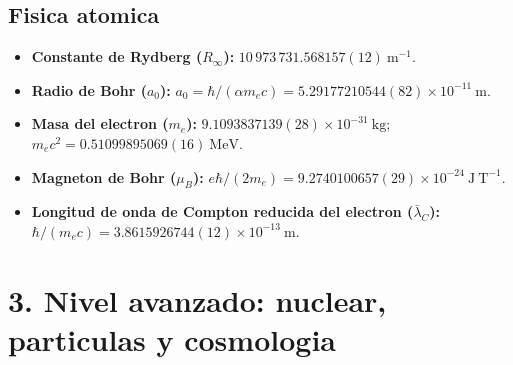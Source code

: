 \documentclass[11pt,a4paper]{article}
\begin{document}
\subsection*{Fisica atomica}

\begin{itemize}
  \item \textbf{Constante de Rydberg ($R_\infty$):} $10\,973\,731.568157(12)\ \mathrm{m^{-1}}$.
  \item \textbf{Radio de Bohr ($a_0$):} $a_0=\hbar/(\alpha m_ec)=5.29177210544(82)\times10^{-11}\ \mathrm m$.
  \item \textbf{Masa del electron ($m_e$):} $9.1093837139(28)\times10^{-31}\ \mathrm{kg}$; $m_ec^2=0.51099895069(16)\ \mathrm{MeV}$.
  \item \textbf{Magneton de Bohr ($\mu_B$):} $e\hbar/(2m_e)=9.2740100657(29)\times10^{-24}\ \mathrm{J\ T^{-1}}$.
  \item \textbf{Longitud de onda de Compton reducida del electron ($\bar\lambda_C$):} $\hbar/(m_ec)=3.8615926744(12)\times10^{-13}\ \mathrm m$.
\end{itemize}

\section*{3. Nivel avanzado: nuclear, particulas y cosmologia}
\end{document}
